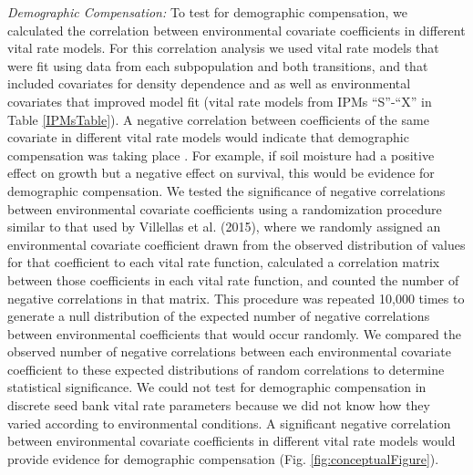\documentclass[12pt, letterpaper]{article}
\begin{document}
\textit{Demographic Compensation:} To test for demographic compensation, we calculated the correlation between environmental covariate coefficients in different vital rate models. For this correlation analysis we used vital rate models that were fit using data from each subpopulation and both transitions, and that included covariates for density dependence and as well as environmental covariates that improved model fit (vital rate models from IPMs “S”-“X” in Table \ref{IPMsTable}). A negative correlation between coefficients of the same covariate in different vital rate models would indicate that demographic compensation was taking place \cite{Villellas2015DemographicImplications, Dibner2019}. For example, if soil moisture had a positive effect on growth but a negative effect on survival, this would be evidence for demographic compensation. We tested the significance of negative correlations between environmental covariate coefficients using a randomization procedure similar to that used by Villellas et al. (2015), where we randomly assigned an environmental covariate coefficient drawn from the observed distribution of values for that coefficient to each vital rate function, calculated a correlation matrix between those coefficients in each vital rate function, and counted the number of negative correlations in that matrix. This procedure was repeated 10,000 times to generate a null distribution of the expected number of negative correlations between environmental coefficients that would occur randomly. We compared the observed number of negative correlations between each environmental covariate coefficient to these expected distributions of random correlations to determine statistical significance. We could not test for demographic compensation in discrete seed bank vital rate parameters because we did not know how they varied according to environmental conditions.  A significant negative correlation between environmental covariate coefficients in different vital rate models would provide evidence for demographic compensation (Fig. \ref{fig:conceptualFigure}).  
\end{document}
